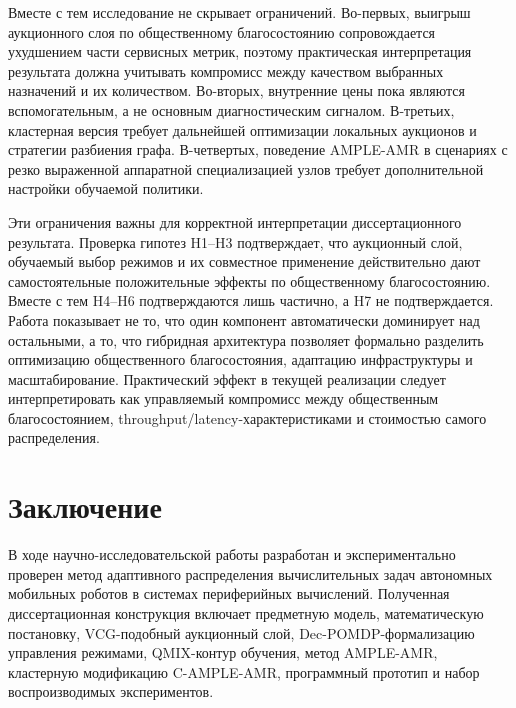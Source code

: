 \documentclass[a4paper,14pt]{extarticle}
\begin{document}
Вместе с тем исследование не скрывает ограничений. Во-первых, выигрыш аукционного слоя по общественному благосостоянию сопровождается ухудшением части сервисных метрик, поэтому практическая интерпретация результата должна учитывать компромисс между качеством выбранных назначений и их количеством. Во-вторых, внутренние цены пока являются вспомогательным, а не основным диагностическим сигналом. В-третьих, кластерная версия требует дальнейшей оптимизации локальных аукционов и стратегии разбиения графа. В-четвертых, поведение AMPLE-AMR в сценариях с резко выраженной аппаратной специализацией узлов требует дополнительной настройки обучаемой политики.

Эти ограничения важны для корректной интерпретации диссертационного результата. Проверка гипотез H1--H3 подтверждает, что аукционный слой, обучаемый выбор режимов и их совместное применение действительно дают самостоятельные положительные эффекты по общественному благосостоянию. Вместе с тем H4--H6 подтверждаются лишь частично, а H7 не подтверждается. Работа показывает не то, что один компонент автоматически доминирует над остальными, а то, что гибридная архитектура позволяет формально разделить оптимизацию общественного благосостояния, адаптацию инфраструктуры и масштабирование. Практический эффект в текущей реализации следует интерпретировать как управляемый компромисс между общественным благосостоянием, throughput/latency-характеристиками и стоимостью самого распределения.

\section{Заключение}

В ходе научно-исследовательской работы разработан и экспериментально проверен метод адаптивного распределения вычислительных задач автономных мобильных роботов в системах периферийных вычислений. Полученная диссертационная конструкция включает предметную модель, математическую постановку, VCG-подобный аукционный слой, Dec-POMDP-формализацию управления режимами, QMIX-контур обучения, метод AMPLE-AMR, кластерную модификацию C-AMPLE-AMR, программный прототип и набор воспроизводимых экспериментов.
\end{document}
